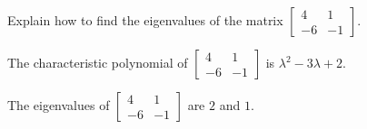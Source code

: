 
\begin{exerciseStatement}


Explain how to find the eigenvalues of the matrix \( \left[\begin{array}{cc}
4 & 1 \\
-6 & -1
\end{array}\right] \).


\end{exerciseStatement}
    
\begin{exerciseAnswer} 


The characteristic polynomial of \( \left[\begin{array}{cc}
4 & 1 \\
-6 & -1
\end{array}\right] \) is \( \lambda^{2} - 3 \lambda + 2 \).



The eigenvalues of \( \left[\begin{array}{cc}
4 & 1 \\
-6 & -1
\end{array}\right] \) are \( 2 \) and \( 1 \).


\end{exerciseAnswer}
    
